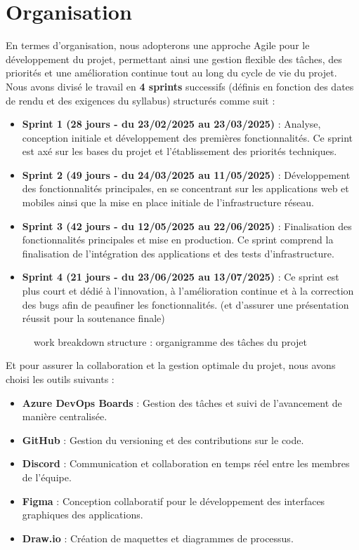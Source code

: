 \documentclass{report}
\begin{document}
\section*{\centering Organisation}
\vspace{0.5cm}
\noindent En termes d'organisation, nous adopterons une approche Agile pour le développement du projet, permettant ainsi une gestion flexible des tâches, des priorités et une amélioration continue tout au long du cycle de vie du projet. Nous avons divisé le travail en \textbf{4 sprints} successifs (définis en fonction des dates de rendu et des exigences du syllabus) structurés comme suit :
\begin{itemize}
    \item \textbf{Sprint 1 (28 jours - du 23/02/2025 au 23/03/2025)} : Analyse, conception initiale et développement des premières fonctionnalités. Ce sprint est axé sur les bases du projet et l'établissement des priorités techniques.
    \item \textbf{Sprint 2 (49 jours - du 24/03/2025 au 11/05/2025)} : Développement des fonctionnalités principales, en se concentrant sur les applications web et mobiles ainsi que la mise en place initiale de l'infrastructure réseau.
    \item \textbf{Sprint 3 (42 jours - du 12/05/2025 au 22/06/2025)} : Finalisation des fonctionnalités principales et mise en production. Ce sprint comprend la finalisation de l'intégration des applications et des tests d'infrastructure.
    \item \textbf{Sprint 4 (21 jours - du 23/06/2025 au 13/07/2025)} : Ce sprint est plus court et dédié à l'innovation, à l'amélioration continue et à la correction des bugs afin de peaufiner les fonctionnalités. (et d'assurer une présentation réussit pour la soutenance finale)
\end{itemize}
\begin{figure}[H]
    \centering
    
    \caption{work breakdown structure : organigramme des tâches du projet}
\end{figure}
\newpage %
\noindent  Et pour assurer la collaboration et la gestion optimale du projet, nous avons choisi les outils suivants :
\begin{itemize}
    \item \textbf{Azure DevOps Boards} : Gestion des tâches et suivi de l'avancement de manière centralisée.
    \item \textbf{GitHub} : Gestion du versioning et des contributions sur le code.
    \item \textbf{Discord} : Communication et collaboration en temps réel entre les membres de l'équipe.
    \item \textbf{Figma} : Conception collaboratif pour le développement des interfaces graphiques des applications.
    \item \textbf{Draw.io} : Création de maquettes et diagrammes de processus.
\end{itemize}
\vspace{1cm}
\end{document}
